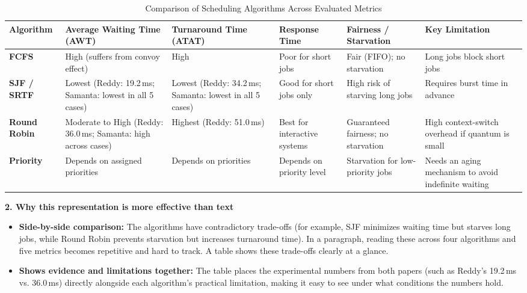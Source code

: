 \documentclass[11pt]{article}
\begin{document}
\begin{table}[htbp]
    \centering
    \footnotesize
    \caption{Comparison of Scheduling Algorithms Across Evaluated Metrics}
    \label{tab:scheduling_comparison}
    \vspace{0.5em}
    \begin{tabular}{|p{1.8cm}|p{2.3cm}|p{2.2cm}|p{2.0cm}|p{2.2cm}|p{2.5cm}|}
        \hline
        \textbf{Algorithm} & \textbf{Average Waiting Time (AWT)} & \textbf{Turnaround Time (ATAT)} & \textbf{Response Time} & \textbf{Fairness / Starvation} & \textbf{Key Limitation} \\
        \hline
        \textbf{FCFS} & High (suffers from convoy effect) & High & Poor for short jobs & Fair (FIFO); no starvation & Long jobs block short jobs \\
        \hline
        \textbf{SJF / SRTF} & Lowest (Reddy: 19.2\,ms; Samanta: lowest in all 5 cases) & Lowest (Reddy: 34.2\,ms; Samanta: lowest in all 5 cases) & Good for short jobs only & High risk of starving long jobs & Requires burst time in advance \\
        \hline
        \textbf{Round Robin} & Moderate to High (Reddy: 36.0\,ms; Samanta: high across cases) & Highest (Reddy: 51.0\,ms) & Best for interactive systems & Guaranteed fairness; no starvation & High context-switch overhead if quantum is small \\
        \hline
        \textbf{Priority} & Depends on assigned priorities & Depends on priorities & Depends on priority level & Starvation for low-priority jobs & Needs an aging mechanism to avoid indefinite waiting \\
        \hline
    \end{tabular}
\end{table}

\vspace{0.8em}
\noindent\textbf{2. Why this representation is more effective than text}

\begin{itemize}
    \item \textbf{Side-by-side comparison:} The algorithms have contradictory trade-offs (for example, SJF minimizes waiting time but starves long jobs, while Round Robin prevents starvation but increases turnaround time). In a paragraph, reading these across four algorithms and five metrics becomes repetitive and hard to track. A table shows these trade-offs clearly at a glance.
    \item \textbf{Shows evidence and limitations together:} The table places the experimental numbers from both papers (such as Reddy's 19.2\,ms vs. 36.0\,ms) directly alongside each algorithm's practical limitation, making it easy to see under what conditions the numbers hold.
\end{itemize}
\end{document}
